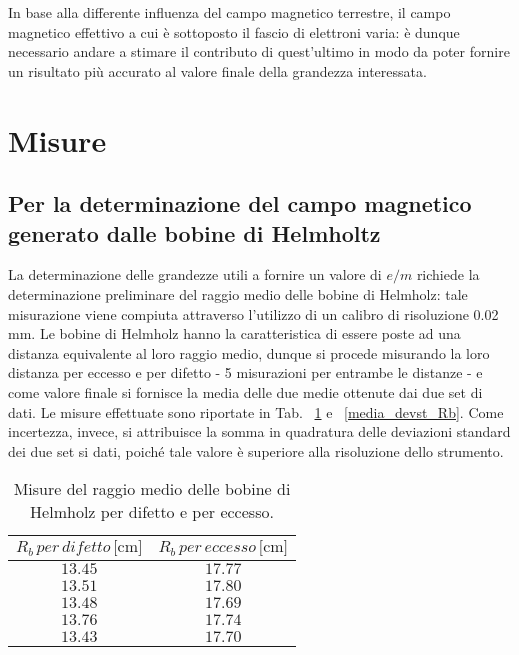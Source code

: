 \documentclass[]{article}
\let\oldsection\section%
\renewcommand{\section}{%
	\renewcommand{\theequation}{\thesection.\arabic{equation}}%
	\oldsection}%
\let\oldsubsection\subsection%
\renewcommand{\subsection}{%
	\renewcommand{\theequation}{\thesubsection.\arabic{equation}}%
	\oldsubsection}%
\begin{document}
    In base alla differente influenza del campo magnetico terrestre, il campo magnetico effettivo a cui è sottoposto il fascio di elettroni varia: è dunque necessario andare a stimare il contributo di quest'ultimo in modo da poter fornire un risultato più accurato al valore finale della grandezza interessata.

    \section{Misure}

    \subsection{Per la determinazione del campo magnetico generato dalle bobine di Helmholtz}

    La determinazione delle grandezze utili a fornire un valore di $e/m$ richiede la determinazione preliminare del raggio medio delle bobine di Helmholz: tale misurazione viene compiuta attraverso l'utilizzo di un calibro di risoluzione 0.02 mm. Le bobine di Helmholz hanno la caratteristica di essere poste ad una distanza equivalente al loro raggio medio, dunque si procede misurando la loro distanza per eccesso e per difetto - 5 misurazioni per entrambe le distanze - e come valore finale si fornisce la media delle due medie ottenute dai due set di dati. Le misure effettuate sono riportate in Tab. ~\ref{Raggio_bobine} e ~\ref{media_devst_Rb}. Come incertezza, invece, si attribuisce la somma in quadratura delle deviazioni standard dei due set si dati, poiché tale valore è superiore alla risoluzione dello strumento.


    \begin{table}[H]
        \centering
    
        \begin{tabular}{||c|c||}
            \hline
            $R_b \, per \, difetto\, \text{[cm]} $ & $R_b \, per \, eccesso\, \text{[cm]} $\\
            \hline\hline
    
            $ 13.45 $ & $ 17.77 $ \\\hline
            $ 13.51 $ & $ 17.80 $ \\\hline
            $ 13.48 $ & $ 17.69 $ \\\hline
            $ 13.76 $ & $ 17.74 $ \\\hline
            $ 13.43 $ & $ 17.70 $ \\\hline
        
        \end{tabular}
        \caption{Misure del raggio medio delle bobine di Helmholz per difetto e per eccesso.}
        \label{Raggio_bobine}
    \end{table}
    
\end{document}

